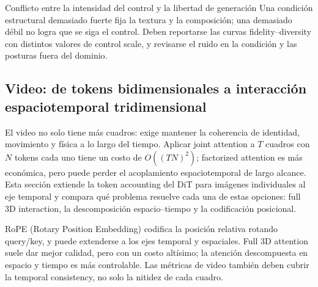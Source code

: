 
\begin{warningbox}{Conflicto entre la intensidad del control y la libertad de generación}
Una condición estructural demasiado fuerte fija la textura y la composición; una demasiado débil no logra que se siga el control. Deben reportarse las curvas fidelity--diversity con distintos valores de control scale, y revisarse el ruido en la condición y las posturas fuera del dominio.
\end{warningbox}

\subsection{Video: de tokens bidimensionales a interacción espaciotemporal tridimensional}

El video no solo tiene más cuadros: exige mantener la coherencia de identidad, movimiento y física a lo largo del tiempo. Aplicar joint attention a $T$ cuadros con $N$ tokens cada uno tiene un costo de $O((TN)^2)$; factorized attention es más económica, pero puede perder el acoplamiento espaciotemporal de largo alcance. Esta sección extiende la token accounting del DiT para imágenes individuales al eje temporal y compara qué problema resuelve cada una de estas opciones: full 3D interaction, la descomposición espacio--tiempo y la codificación posicional.


RoPE (Rotary Position Embedding) codifica la posición relativa rotando query/key, y puede extenderse a los ejes temporal y espaciales. Full 3D attention suele dar mejor calidad, pero con un costo altísimo; la atención descompuesta en espacio y tiempo es más controlable. Las métricas de video también deben cubrir la temporal consistency, no solo la nitidez de cada cuadro.


